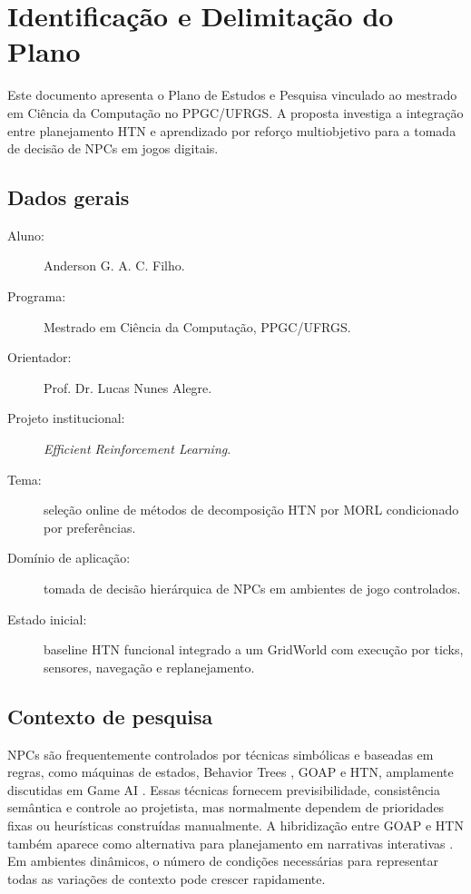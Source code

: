 \chapter{Identificação e Delimitação do Plano}

Este documento apresenta o Plano de Estudos e Pesquisa vinculado ao mestrado
em Ciência da Computação no PPGC/UFRGS. A proposta investiga a integração entre
planejamento HTN e aprendizado por reforço multiobjetivo para a tomada de
decisão de NPCs em jogos digitais.

\section{Dados gerais}

\begin{description}
\item[Aluno:] Anderson G. A. C. Filho.
\item[Programa:] Mestrado em Ciência da Computação, PPGC/UFRGS.
\item[Orientador:] Prof. Dr. Lucas Nunes Alegre.
\item[Projeto institucional:] \textit{Efficient Reinforcement Learning}.
\item[Tema:] seleção online de métodos de decomposição HTN por MORL condicionado por preferências.
\item[Domínio de aplicação:] tomada de decisão hierárquica de NPCs em ambientes de jogo controlados.
\item[Estado inicial:] baseline HTN funcional integrado a um GridWorld com execução por ticks, sensores, navegação e replanejamento.
\end{description}

\section{Contexto de pesquisa}

NPCs são frequentemente controlados por técnicas simbólicas e baseadas em
regras, como máquinas de estados, Behavior Trees \cite{colledanchise2018}, GOAP
e HTN, amplamente discutidas em Game AI \cite{millington2019}. Essas técnicas
fornecem previsibilidade, consistência semântica e controle ao projetista, mas
normalmente dependem de prioridades fixas ou heurísticas construídas
manualmente. A hibridização entre GOAP e HTN também aparece como alternativa
para planejamento em narrativas interativas \cite{artar2019}.
Em ambientes dinâmicos, o número de condições necessárias para representar todas
as variações de contexto pode crescer rapidamente.

